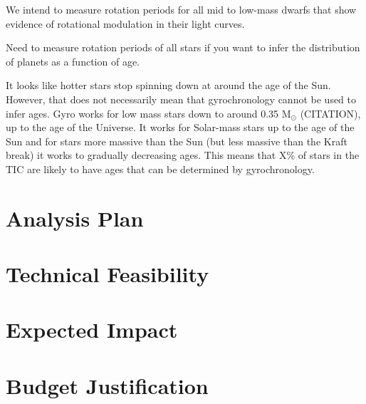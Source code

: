 \documentclass[useAMS, usenatbib, preprint, 12pt]{aastex}
\begin{document}
We intend to measure rotation periods for all mid to low-mass dwarfs that show
evidence of rotational modulation in their light curves.

Need to measure rotation periods of all stars if you want to infer the
distribution of planets as a function of age.

It looks like hotter stars stop spinning down at around the age of the Sun.
However, that does not necessarily mean that gyrochronology cannot be used to
infer ages.
Gyro works for low mass stars down to around 0.35 M$_\odot$ (CITATION), up to
the age of the Universe.
It works for Solar-mass stars up to the age of the Sun and for stars more
massive than the Sun (but less massive than the Kraft break) it works to
gradually decreasing ages.
This means that X\% of stars in the TIC are likely to have ages that can be
determined by gyrochronology.

\section{Analysis Plan}

\section{Technical Feasibility}

\section{Expected Impact}

\section{Budget Justification}



\end{document}
